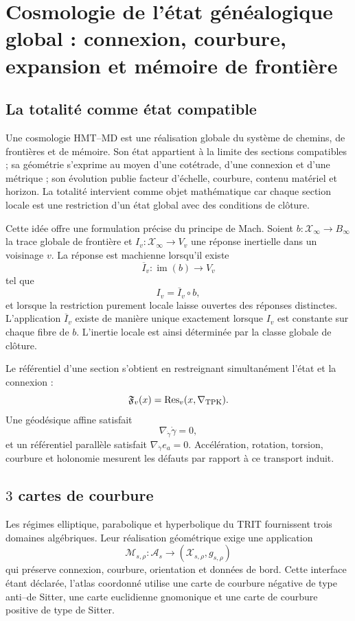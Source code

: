\chapter{Cosmologie de l'état généalogique global : connexion, courbure, expansion et mémoire de frontière}
\label{chap:cosmologia}

\section{La totalité comme état compatible}

Une cosmologie HMT--MD est une réalisation globale du système de chemins,
de frontières et de mémoire. Son état appartient à la limite des sections compatibles ;
sa géométrie s'exprime au moyen d'une cotétrade, d'une connexion et d'une métrique ; son évolution
publie facteur d'échelle, courbure, contenu matériel et horizon. La
totalité intervient comme objet mathématique car chaque section locale est une
restriction d'un état global avec des conditions de clôture.

Cette idée offre une formulation précise du principe de Mach. Soient
\(b:\mathcal X_\infty\to B_\infty\) la trace globale de frontière et
\(I_v:\mathcal X_\infty\to V_v\) une réponse inertielle dans un voisinage
\(v\). La réponse est machienne lorsqu'il existe
\[
 \overline I_v:\operatorname{im}(b)\to V_v
\]
tel que
\[
 I_v=\overline I_v\circ b,
\]
et lorsque la restriction purement locale laisse ouvertes des réponses distinctes.
L'application \(\overline I_v\) existe de manière unique exactement lorsque
\(I_v\) est constante sur chaque fibre de \(b\). L'inertie locale est ainsi
déterminée par la classe globale de clôture.

Le référentiel d'une section s'obtient en restreignant simultanément l'état et
la connexion :
\[
 \mathfrak F_v(x)
 =\operatorname{Res}_v(x,\nabla_{\rm TPK}).
\]
Une géodésique affine satisfait
\[
 \nabla_{\dot\gamma}\dot\gamma=0,
\]
et un référentiel parallèle satisfait
\(\nabla_{\dot\gamma}e_a=0\). Accélération, rotation, torsion, courbure et
holonomie mesurent les défauts par rapport à ce transport induit.

\section{\(3\) cartes de courbure}

Les régimes elliptique, parabolique et hyperbolique du TRIT fournissent trois
domaines algébriques. Leur réalisation géométrique exige une application
\[
 \mathcal M_{s,\rho}:\mathcal A_s
 \longrightarrow(\mathcal X_{s,\rho},g_{s,\rho})
\]
qui préserve connexion, courbure, orientation et données de bord. Cette
interface étant déclarée, l'atlas coordonné utilise une carte de courbure
négative de type anti--de Sitter, une carte euclidienne gnomonique et une carte de
courbure positive de type de Sitter.

